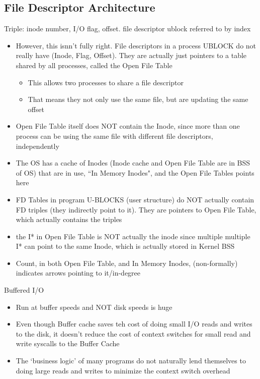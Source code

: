 \subsection{File Descriptor Architecture}
Triple: inode number, I/O flag, offset. file descriptor ublock referred to by index
\begin{itemize}
    \item However, this isnn't fully right. File descriptors in a process UBLOCK do not really have (Inode, Flag, Offset). They are actually just pointers to a table shared by all processes, called the Open File Table
    \begin{itemize}
        \item This allows two processes to share a file descriptor
        \item That means they not only use the same file, but are updating the same offset
    \end{itemize}
    \item Open File Table itself does NOT contain the Inode, since more than one process can be using the same file with different file descriptors, independently
    \item The OS has a cache of Inodes (Inode cache and Open File Table are in BSS of OS) that are in use, ``In Memory Inodes", and the Open File Tables points here
    \item FD Tables in program U-BLOCKS (user structure) do NOT actually contain FD triples (they indirectly point to it). They are pointers to Open File Table, which actually contains the triples
    \item the I* in Open File Table is NOT actually the inode since multiple multiple I* can point to the same Inode, which is actually stored in Kernel BSS
    \item Count, in both Open File Table, and In Memory Inodes, (non-formally) indicates arrows pointing to it/in-degree
\end{itemize}
Buffered I/O
\begin{itemize}
    \item Run at buffer speeds and NOT disk speeds is huge
    \item Even though Buffer cache saves teh cost of doing small I/O reads and writes to the disk, it doesn't reduce the cost of context switches for small read and write syscalls to the Buffer Cache
    \item The `business logic' of many programs do not naturally lend themselves to doing large reads and writes to minimize the context switch overhead
\end{itemize}
